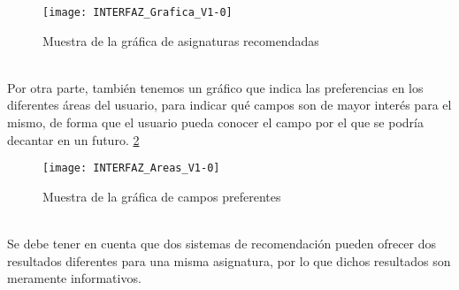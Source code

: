 \begin{figure}[h]
\centering
\texttt{[image: INTERFAZ\_Grafica\_V1-0]}
\caption{Muestra de la gráfica de asignaturas recomendadas}
\label{fig:E.2.11}
\end{figure}
\\Por otra parte, también tenemos un gráfico que indica las preferencias en los diferentes áreas del usuario, para indicar qué campos son de mayor interés para el mismo, de forma que el usuario pueda conocer el campo por el que se podría decantar en un futuro. \ref{fig:E.2.12} 
\begin{figure}[h]
\centering
\texttt{[image: INTERFAZ\_Areas\_V1-0]}
\caption{Muestra de la gráfica de campos preferentes}
\label{fig:E.2.12}
\end{figure}
\\
Se debe tener en cuenta que dos sistemas de recomendación pueden ofrecer dos resultados diferentes para una misma asignatura, por lo que dichos resultados son meramente informativos. 

